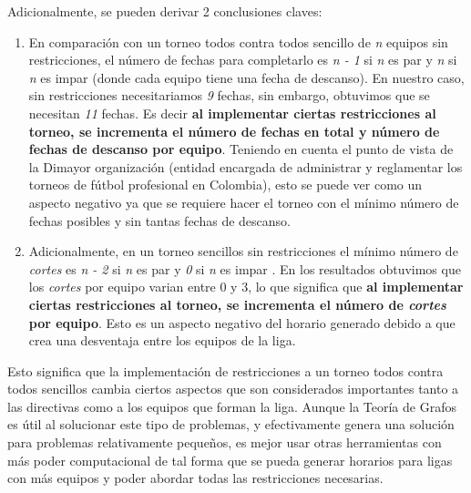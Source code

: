 \documentclass[11pt]{article}
\begin{document}
\begin{multicols}{2}
            Adicionalmente, se pueden derivar 2 conclusiones claves:
            \begin{enumerate}
                \item En comparación con un torneo todos contra todos sencillo de \textit{n} equipos sin restricciones, el número de fechas para completarlo es \textit{n - 1} si \textit{n} es par y \textit{n} si \textit{n} es impar (donde cada equipo tiene una fecha de descanso).
                En nuestro caso, sin restricciones necesitariamos \textit{9} fechas, sin embargo, obtuvimos que se necesitan \textit{11} fechas. Es decir \textbf{al implementar ciertas restricciones al torneo, se incrementa el número de fechas en total y número de fechas de descanso por equipo}.
                Teniendo en cuenta el punto de vista de la Dimayor organización (entidad encargada de administrar y reglamentar los torneos de fútbol profesional en Colombia), 
                esto se puede ver como un aspecto negativo ya que se requiere hacer el torneo con el mínimo número de fechas posibles y sin tantas fechas de descanso.
                \item Adicionalmente, en un torneo sencillos sin restricciones el mínimo número de \textit{cortes} es \textit{n - 2} si \textit{n} es par y \textit{0} si \textit{n} es impar \cite{de1988some}.  
                En los resultados obtuvimos que los \textit{cortes} por equipo varian entre 0 y 3, lo que significa que \textbf{al implementar ciertas restricciones al torneo, se incrementa el número de \textit{cortes} por equipo}.
                Esto es un aspecto negativo del horario generado debido a que crea una desventaja entre los equipos de la liga.             
            \end{enumerate}
            
            Esto significa que la implementación de restricciones a un torneo todos contra todos sencillos cambia ciertos aspectos que son considerados importantes tanto a las directivas como a los equipos que forman la liga.
            Aunque la Teoría de Grafos es útil al solucionar este tipo de problemas, y efectivamente genera una solución para problemas relativamente pequeños, es mejor usar otras herramientas con más poder computacional de 
            tal forma que se pueda generar horarios para ligas con más equipos y poder abordar todas las restricciones necesarias.  
            
        
        
        \nocite{lewis2011application}
        \nocite{de1990constrained}
        \nocite{hoshino2013graph}
    \end{multicols}
\end{document}
